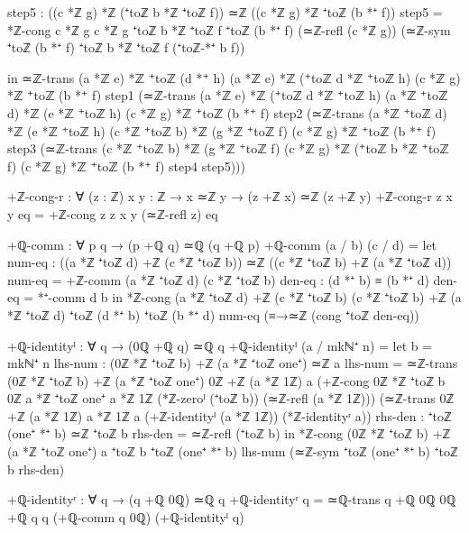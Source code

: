 \documentclass[11pt,a4paper]{book}
\begin{document}
\begin{code}
    step5 : ((c *ℤ g) *ℤ (⁺toℤ b *ℤ ⁺toℤ f)) ≃ℤ ((c *ℤ g) *ℤ ⁺toℤ (b *⁺ f))
    step5 = *ℤ-cong {c *ℤ g} {c *ℤ g} {⁺toℤ b *ℤ ⁺toℤ f} {⁺toℤ (b *⁺ f)}
                    (≃ℤ-refl (c *ℤ g)) (≃ℤ-sym {⁺toℤ (b *⁺ f)} {⁺toℤ b *ℤ ⁺toℤ f} (⁺toℤ-*⁺ b f))
    
  in ≃ℤ-trans {(a *ℤ e) *ℤ ⁺toℤ (d *⁺ h)} {(a *ℤ e) *ℤ (⁺toℤ d *ℤ ⁺toℤ h)} {(c *ℤ g) *ℤ ⁺toℤ (b *⁺ f)}
       step1 (≃ℤ-trans {(a *ℤ e) *ℤ (⁺toℤ d *ℤ ⁺toℤ h)} {(a *ℤ ⁺toℤ d) *ℤ (e *ℤ ⁺toℤ h)} {(c *ℤ g) *ℤ ⁺toℤ (b *⁺ f)}
              step2 (≃ℤ-trans {(a *ℤ ⁺toℤ d) *ℤ (e *ℤ ⁺toℤ h)} {(c *ℤ ⁺toℤ b) *ℤ (g *ℤ ⁺toℤ f)} {(c *ℤ g) *ℤ ⁺toℤ (b *⁺ f)}
                     step3 (≃ℤ-trans {(c *ℤ ⁺toℤ b) *ℤ (g *ℤ ⁺toℤ f)} {(c *ℤ g) *ℤ (⁺toℤ b *ℤ ⁺toℤ f)} {(c *ℤ g) *ℤ ⁺toℤ (b *⁺ f)}
                            step4 step5)))

+ℤ-cong-r : ∀ (z : ℤ) {x y : ℤ} → x ≃ℤ y → (z +ℤ x) ≃ℤ (z +ℤ y)
+ℤ-cong-r z {x} {y} eq = +ℤ-cong {z} {z} {x} {y} (≃ℤ-refl z) eq

+ℚ-comm : ∀ p q → (p +ℚ q) ≃ℚ (q +ℚ p)
+ℚ-comm (a / b) (c / d) = 
  let num-eq : ((a *ℤ ⁺toℤ d) +ℤ (c *ℤ ⁺toℤ b)) ≃ℤ ((c *ℤ ⁺toℤ b) +ℤ (a *ℤ ⁺toℤ d))
      num-eq = +ℤ-comm (a *ℤ ⁺toℤ d) (c *ℤ ⁺toℤ b)
      den-eq : (d *⁺ b) ≡ (b *⁺ d)
      den-eq = *⁺-comm d b
  in *ℤ-cong {(a *ℤ ⁺toℤ d) +ℤ (c *ℤ ⁺toℤ b)} 
             {(c *ℤ ⁺toℤ b) +ℤ (a *ℤ ⁺toℤ d)}
             {⁺toℤ (d *⁺ b)} {⁺toℤ (b *⁺ d)}
             num-eq (≡→≃ℤ (cong ⁺toℤ den-eq))

+ℚ-identityˡ : ∀ q → (0ℚ +ℚ q) ≃ℚ q
+ℚ-identityˡ (a / mkℕ⁺ n) = 
  let b = mkℕ⁺ n
      lhs-num : (0ℤ *ℤ ⁺toℤ b) +ℤ (a *ℤ ⁺toℤ one⁺) ≃ℤ a
      lhs-num = ≃ℤ-trans {(0ℤ *ℤ ⁺toℤ b) +ℤ (a *ℤ ⁺toℤ one⁺)} 
                         {0ℤ +ℤ (a *ℤ 1ℤ)} 
                         {a}
                (+ℤ-cong {0ℤ *ℤ ⁺toℤ b} {0ℤ} {a *ℤ ⁺toℤ one⁺} {a *ℤ 1ℤ} 
                         (*ℤ-zeroˡ (⁺toℤ b)) 
                         (≃ℤ-refl (a *ℤ 1ℤ)))
                (≃ℤ-trans {0ℤ +ℤ (a *ℤ 1ℤ)} {a *ℤ 1ℤ} {a}
                          (+ℤ-identityˡ (a *ℤ 1ℤ))
                          (*ℤ-identityʳ a))
      rhs-den : ⁺toℤ (one⁺ *⁺ b) ≃ℤ ⁺toℤ b
      rhs-den = ≃ℤ-refl (⁺toℤ b)
  in *ℤ-cong {(0ℤ *ℤ ⁺toℤ b) +ℤ (a *ℤ ⁺toℤ one⁺)} {a} {⁺toℤ b} {⁺toℤ (one⁺ *⁺ b)}
             lhs-num 
             (≃ℤ-sym {⁺toℤ (one⁺ *⁺ b)} {⁺toℤ b} rhs-den)

+ℚ-identityʳ : ∀ q → (q +ℚ 0ℚ) ≃ℚ q
+ℚ-identityʳ q = ≃ℚ-trans {q +ℚ 0ℚ} {0ℚ +ℚ q} {q} (+ℚ-comm q 0ℚ) (+ℚ-identityˡ q)


\end{code}
\end{document}
